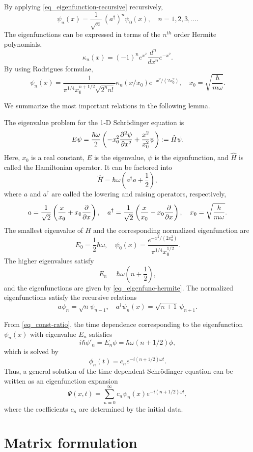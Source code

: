 \documentclass[11pt]{article}
\begin{document}
By applying \eqref{eq_eigenfunction-recursive} recursively,
\[
\psi_{n}(x) = \frac{1}{\sqrt{n}}\,
(a^\dag)^n\psi_0(x),\quad n=1,2,3,\ldots. 
\]
The eigenfunctions can be expressed in terms of the $n^{th}$ order Hermite polynomials,
\[
\kappa_n(x) = (-1)^n e^{x^2} \frac{d^n}{dx^n} e^{-x^2}.
\]
By using Rodrigues formulae,
\begin{equation}\label{eq_eigenfunc-hermite}
\psi_n(x) = \frac{1}{\pi^{1/4} x_0^{n+1/2} \sqrt{2^n n!}} \kappa_n(x/x_0) e^{-x^2/(2 x_0^2)},\quad
x_0=\sqrt{\frac{\hbar}{m\omega}}.
\end{equation}

We summarize the most important relations in the following lemma.
\begin{lemma}
  The eigenvalue problem for the 1-D Schr\"odinger equation is
  \[
  E\psi = \frac{\hbar\omega}{2}\left( - x_0^2 \frac{\partial^2\psi}{\partial x^2} + \frac{x^2}{x_0^2}
  \psi\right) := \hat{H}\psi.
  \]
  Here, $x_0$ is a real constant, $E$ is the eigenvalue, $\psi$ is the eigenfunction, and $\hat{H}$
  is called the Hamiltonian operator. It can be factored into
  \[
  \hat{H} = \hbar\omega \left( a^\dag a + \frac{1}{2} \right),
  \]
  where $a$ and $a^\dag$ are called the lowering and raising operators, respectively,
  \[
  a = \frac{1}{\sqrt{2}}\left( \frac{x}{x_0} + x_0 \frac{\partial}{\partial x}\right),\quad
  a^\dag = \frac{1}{\sqrt{2}}\left( \frac{x}{x_0} - x_0 \frac{\partial}{\partial x}\right),\quad
  x_0=\sqrt{\frac{\hbar}{m\omega}}.
  \]
  The smallest eigenvalue of $H$ and the corresponding normalized eigenfunction are
  \[
  E_0 = \frac{1}{2}\hbar\omega,\quad \psi_0(x) = \frac{e^{-x^2/(2 x_0^2)}}{\pi^{1/4} x_0^{1/2}}.
  \]
  The higher eigenvalues satisfy
  \[
  E_n = \hbar\omega\left(n + \frac{1}{2}\right),
  \]
  and the eigenfunctions are given by \eqref{eq_eigenfunc-hermite}. The normalized eigenfunctions
  satisfy the recursive relations
  \[
  a \psi_n = \sqrt{n} \psi_{n-1},\quad a^\dag \psi_n(x) = \sqrt{n+1}\, \psi_{n+1}.
  \]
\end{lemma}

From \eqref{eq_const-ratio}, the time dependence corresponding to the eigenfunction $\psi_n(x)$ with
eigenvalue $E_n$ satisfies 
\[
i\hbar \phi'_n = E_n \phi = \hbar\omega(n+1/2) \phi,
\]
which is solved by
\[
\phi_n(t) = c_n e^{-i(n+1/2)\omega t}.
\]
Thus, a general solution of the time-dependent Schr\"odinger equation can be written as an
eigenfunction expansion
\[
\Psi(x,t) = \sum_{n=0}^\infty c_n \psi_n(x) e^{-i(n+1/2)\omega t},
\]
where the coefficients $c_n$ are determined by the initial data.

\section{Matrix formulation}



\end{document}
